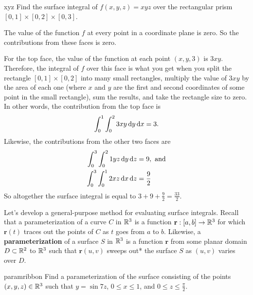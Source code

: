 \documentclass{watsonbook}
\begin{document}
\begin{example}{}{xyz}
  Find the surface integral of $f(x,y,z) = xyz$ over the rectangular
  prism $[0,1] \times [0,2] \times [0,3]$. 
\end{example}

\begin{solution}
  The value of the function $f$ at every point in a coordinate plane
  is zero. So the contributions from these faces is zero.

  For the top face, the value of the function at each point $(x,y,3)$
  is $3xy$. Therefore, the integral of $f$ over this face is what you
  get when you split the rectangle $[0,1] \times [0,2]$ into many
  small rectangles, multiply the value of $3xy$ by the area of each
  one (where $x$ and $y$ are the first and second coordinates of some
  point in the small rectangle), sum the results, and take the
  rectangle size to zero. In other words, the contribution from the
  top face is
  \[
    \int_0^1 \int_0^2 3xy \, \mathrm{d} y\, \mathrm{d} x = 3. 
  \]
  Likewise, the contributions from the other two faces are
  \begin{align*}
    \int_0^3 \int_0^2 1yz \, \mathrm{d} y\, \mathrm{d} z &= 9, \text{ and} \\
                                           \int_{0}^{3}
                                           \int_{0}^{1}2xz \, \mathrm{d} x\,
                                           \mathrm{d} z &= \frac{9}{2}
  \end{align*}
  So altogether the surface integral is equal to $\displaystyle{3 + 9 +
  \frac{9}{2}} = \boxed{\frac{33}{2}}$. 
\end{solution}

Let's develop a general-purpose method for evaluating surface
integrals. Recall that a parameterization of a curve $C$ in $\mathbb{R}^3$ is
a function $\mathbf{r}: [a,b] \to \mathbb{R}^3$ for which $\mathbf{r}(t)$
traces out the points of $C$ as $t$ goes from $a$ to $b$. Likewise, a
\textbf{parameterization} of a surface $S$ in $\mathbb{R}^3$ is a function
$\mathbf{r}$ from some planar domain $D \subset \mathbb{R}^2$ to $\mathbb{R}^3$ such
that $\mathbf{r}(u,v)$ sweeps out*  the
surface $S$ as $(u,v)$ varies over $D$.

\begin{exercise}{}{paramribbon}
  Find a parameterization of the surface consisting of the points
  $(x,y,z) \in \mathbb{R}^3$ such that $y = \sin 7z$, $0 \leq x \leq 1$, and
  $0 \leq z \leq \frac{\pi}{2}$. 
\end{exercise}
\end{document}
